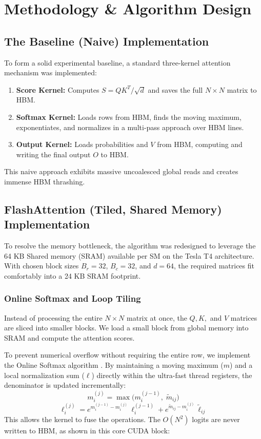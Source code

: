 \documentclass[12pt]{article}
\begin{document}
\section{Methodology \& Algorithm Design}

\subsection{The Baseline (Naive) Implementation}
To form a solid experimental baseline, a standard three-kernel attention mechanism was implemented:
\begin{enumerate}
    \item \textbf{Score Kernel:} Computes $S = QK^T / \sqrt{d}$ and saves the full $N \times N$ matrix to HBM.
    \item \textbf{Softmax Kernel:} Loads rows from HBM, finds the moving maximum, exponentiates, and normalizes in a multi-pass approach over HBM lines.
    \item \textbf{Output Kernel:} Loads probabilities and $V$ from HBM, computing and writing the final output $O$ to HBM.
\end{enumerate}
This naive approach exhibits massive uncoalesced global reads and creates immense HBM thrashing.

\subsection{FlashAttention (Tiled, Shared Memory) Implementation}
To resolve the memory bottleneck, the algorithm was redesigned to leverage the 64 KB Shared memory (SRAM) available per SM on the Tesla T4 architecture. With chosen block sizes $B_r = 32$, $B_c = 32$, and $d = 64$, the required matrices fit comfortably into a 24 KB SRAM footprint.

\subsubsection{Online Softmax and Loop Tiling}
Instead of processing the entire $N \times N$ matrix at once, the $Q, K,$ and $V$ matrices are sliced into smaller blocks. We load a small block from global memory into SRAM and compute the attention scores. 

To prevent numerical overflow without requiring the entire row, we implement the Online Softmax algorithm \cite{milakov2018}. By maintaining a moving maximum ($m$) and a local normalization sum ($\ell$) directly within the ultra-fast thread registers, the denominator is updated incrementally:
\begin{equation}
m^{(j)}_i = \max\!\bigl(m^{(j-1)}_i,\; \tilde{m}_{ij}\bigr)
\end{equation}
\begin{equation}
\ell^{(j)}_i = e^{m^{(j-1)}_i - m^{(j)}_i}\,\ell^{(j-1)}_i + e^{\tilde{m}_{ij} - m^{(j)}_i}\,\tilde{\ell}_{ij}
\end{equation}
This allows the kernel to fuse the operations. The $O(N^2)$ logits are never written to HBM, as shown in this core CUDA block:
\end{document}

